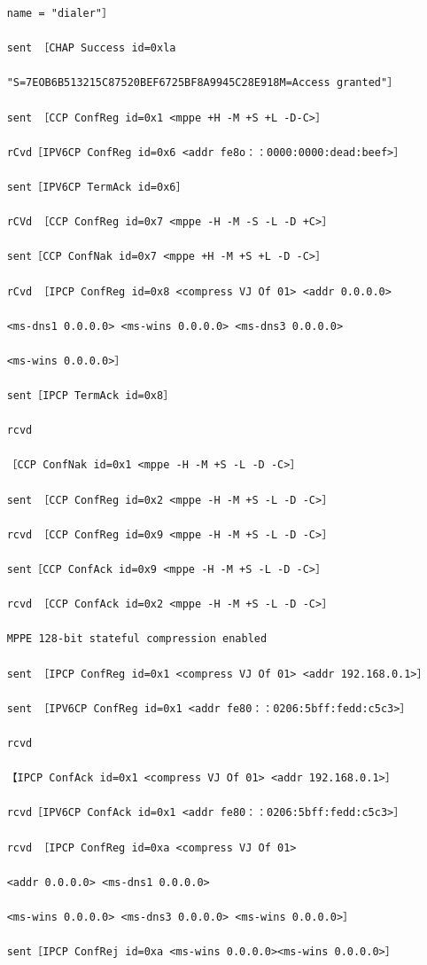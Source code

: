 \begin{verbatim}
    name = "dialer"］
    
    sent ［CHAP Success id=0xla
    
    "S=7EOB6B513215C87520BEF6725BF8A9945C28E918M=Access granted"］
    
    sent ［CCP ConfReg id=0x1 <mppe +H -M +S +L -D-C>］
    
    rCvd［IPV6CP ConfReg id=0x6 <addr fe8o：：0000:0000:dead:beef>］
    
    sent［IPV6CP TermAck id=0x6］
    
    rCVd ［CCP ConfReg id=0x7 <mppe -H -M -S -L -D +C>］
    
    sent［CCP ConfNak id=0x7 <mppe +H -M +S +L -D -C>］
    
    rCvd ［IPCP ConfReg id=0x8 <compress VJ Of 01> <addr 0.0.0.0>
    
    <ms-dns1 0.0.0.0> <ms-wins 0.0.0.0> <ms-dns3 0.0.0.0>
    
    <ms-wins 0.0.0.0>］
    
    sent［IPCP TermAck id=0x8］
    
    rcvd
    
    ［CCP ConfNak id=0x1 <mppe -H -M +S -L -D -C>］
    
    sent ［CCP ConfReg id=0x2 <mppe -H -M +S -L -D -C>］
    
    rcvd ［CCP ConfReg id=0x9 <mppe -H -M +S -L -D -C>］
    
    sent［CCP ConfAck id=0x9 <mppe -H -M +S -L -D -C>］
    
    rcvd ［CCP ConfAck id=0x2 <mppe -H -M +S -L -D -C>］
    
    MPPE 128-bit stateful compression enabled
    
    sent ［IPCP ConfReg id=0x1 <compress VJ Of 01> <addr 192.168.0.1>］
    
    sent ［IPV6CP ConfReg id=0x1 <addr fe80：：0206:5bff:fedd:c5c3>］
    
    rcvd
    
    【IPCP ConfAck id=0x1 <compress VJ Of 01> <addr 192.168.0.1>］
    
    rcvd［IPV6CP ConfAck id=0x1 <addr fe80：：0206:5bff:fedd:c5c3>］
    
    rcvd ［IPCP ConfReg id=0xa <compress VJ Of 01>
    
    <addr 0.0.0.0> <ms-dns1 0.0.0.0>
    
    <ms-wins 0.0.0.0> <ms-dns3 0.0.0.0> <ms-wins 0.0.0.0>］
    
    sent［IPCP ConfRej id=0xa <ms-wins 0.0.0.0><ms-wins 0.0.0.0>］
    

\end{verbatim}
